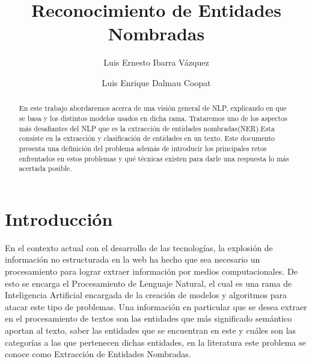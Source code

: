 \documentclass[runningheads]{llncs}
\begin{document}
%
\title{Reconocimiento de Entidades Nombradas}
%
%
\author{Luis Ernesto Ibarra Vázquez \and
Luis Enrique Dalmau Coopat}
%
%
%
\maketitle              %
%
\begin{abstract}

En este trabajo abordaremos acerca de una visión general de NLP, explicando en que se basa y los distintos modelos usados en dicha rama. Trataremos uno de los aspectos más desafiantes del NLP que es la extracción de entidades nombradas(NER).Esta consiste en la extracción y clasificación de entidades en un texto. Este documento presenta una definición del problema además de introducir los principales retos enfrentados en estos problemas y qué técnicas existen para darle una respuesta lo más acertada posible. 

\end{abstract}
%
%
%
\section{Introducción}

En el contexto actual con el desarrollo de las tecnologías, la explosión de información no estructurada en la web ha hecho que sea necesario un procesamiento para lograr extraer información por medios computacionales. De esto se encarga el Procesamiento de Lenguaje Natural, el cual es una rama de Inteligencia Artificial encargada de la creación de modelos y algoritmos para atacar este tipo de problemas. Una información en particular que se desea extraer en el procesamiento de textos son las entidades que más significado semántico aportan al texto, saber las entidades que se encuentran en este y cuáles son las categorías a las que pertenecen dichas entidades, en la literatura este problema se conoce como Extracción de Entidades Nombradas.
\end{document}
